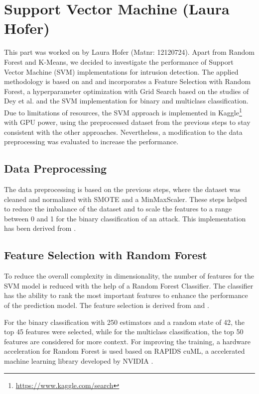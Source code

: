 \section{Support Vector Machine (Laura Hofer)}
This part was worked on by Laura Hofer (Matnr: 12120724). 
Apart from Random Forest and K-Means, we decided to investigate the performance of Support Vector Machine (SVM) implementations for intrusion detection. 
The applied methodology is based on \cite{SVM} and \cite{dey2023new} and incorporates a Feature Selection with Random Forest, a hyperparameter optimization with Grid Search based on the studies of Dey et al. \cite{dey2023new} and the SVM implementation for binary and multiclass classification. Due to limitations of resources, the SVM approach is implemented in Kaggle\footnote{\url{https://www.kaggle.com/search}} with GPU power, using the preprocessed dataset from the previous steps to stay consistent with the other approaches. Nevertheless, a modification to the data preprocessing was evaluated to increase the performance.

\subsection{Data Preprocessing}
The data preprocessing is based on the previous steps, where the dataset was cleaned and normalized with SMOTE and a MinMaxScaler. These steps helped to reduce the imbalance of the dataset and to scale the features to a range between 0 and 1 for the binary classification of an attack. This implementation has been derived from \cite{SVM}.

\subsection{Feature Selection with Random Forest}
To reduce the overall complexity in dimensionality, the number of features for the SVM model is reduced with the help of a Random Forest Classifier. The classifier has the ability to rank the most important features to enhance the performance of the prediction model. The feature selection is derived from \cite{dey2023new} and \cite{GeeksForGeeks_RandomForestSelection}.

\nextparagraph
For the binary classification with 250 estimators and a random state of 42, the top 45 features were selected, while for the multiclass classification, the top 50 features are considered for more context. For improving the training, a hardware acceleration for Random Forest is used based on RAPIDS cuML, a accelerated machine learning library developed by NVIDIA \cite{GeeksForGeeks_cuML}. 

